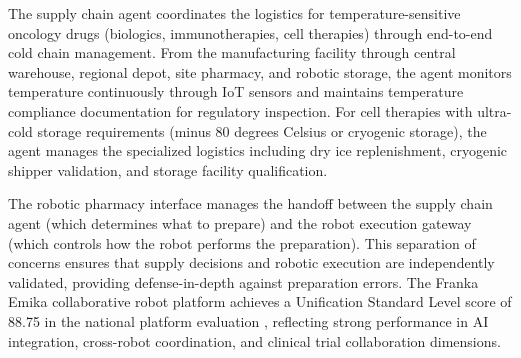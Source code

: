 The supply chain agent coordinates the logistics for temperature-sensitive oncology drugs
(biologics, immunotherapies, cell therapies) through end-to-end cold chain management.
From the manufacturing facility through central warehouse, regional depot, site pharmacy,
and robotic storage, the agent monitors temperature continuously through IoT sensors and
maintains temperature compliance documentation for regulatory inspection. For cell
therapies with ultra-cold storage requirements (minus 80 degrees Celsius or cryogenic
storage), the agent manages the specialized logistics including dry ice replenishment,
cryogenic shipper validation, and storage facility qualification.

The robotic pharmacy interface manages the handoff between the supply chain agent (which
determines what to prepare) and the robot execution gateway (which controls how the robot
performs the preparation). This separation of concerns ensures that supply decisions and
robotic execution are independently validated, providing defense-in-depth against
preparation errors. The Franka Emika collaborative robot platform achieves a Unification
Standard Level score of 88.75 in the national platform evaluation \cite{national-platform-paper},
reflecting strong performance in AI integration, cross-robot coordination, and clinical
trial collaboration dimensions.
